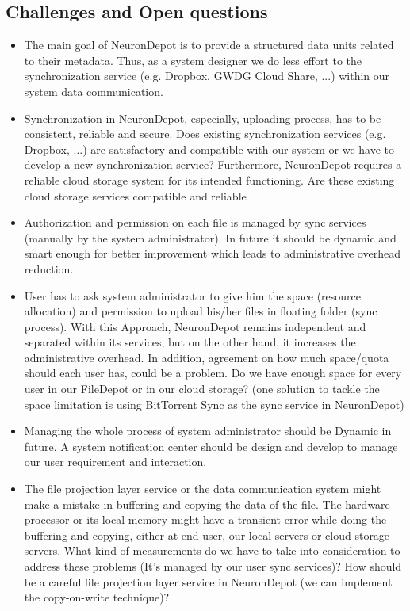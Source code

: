 \documentclass{frontiersSCNS} %
\begin{document}
\subsection{Challenges and Open questions}

\begin{itemize}
\item The main goal of NeuronDepot is to provide a structured data units
related to their metadata. Thus, as a system designer we do less effort to the
synchronization service (e.g. Dropbox, GWDG Cloud Share, ...) within our system
data communication.
\item Synchronization in NeuronDepot, especially, uploading process, has to be
consistent, reliable and secure. Does existing synchronization services (e.g.
Dropbox, ...) are satisfactory and compatible with our system or we have to
develop a new synchronization service? Furthermore, NeuronDepot requires a
reliable cloud storage system for its intended functioning. Are these existing
cloud storage services compatible and reliable ~\cite{Borgmann2012}
\item Authorization and permission on each file is managed by sync services
(manually by the system administrator). In future it should be dynamic and
smart enough for better improvement which leads to administrative overhead
reduction.
\item User has to ask system administrator to give him the space (resource
allocation) and permission to upload his/her files in floating folder (sync
process). With this Approach, NeuronDepot remains independent and separated
within its services, but on the other hand, it increases the administrative
overhead. In addition, agreement on how much space/quota should each user has,
could be a problem. Do we have enough space for every user in our FileDepot or
in our cloud storage? (one solution to tackle the space limitation is using
BitTorrent Sync as the sync service in NeuronDepot)
\item Managing the whole process of system administrator should be Dynamic in
future. A system notification center should be design and develop to manage our
user requirement and interaction.
\item The file projection layer service or the data communication system might
make a mistake in buffering and copying the data of the file. The hardware
processor or its local memory might have a transient error while doing the
buffering and copying, either at end user, our local servers or cloud storage
servers. What kind of measurements do we have to take into consideration to
address these problems (It's managed by our user sync services)? How should be
a careful file projection layer service in NeuronDepot (we can implement the
copy-on-write technique)?
\end{itemize}
\end{document}
